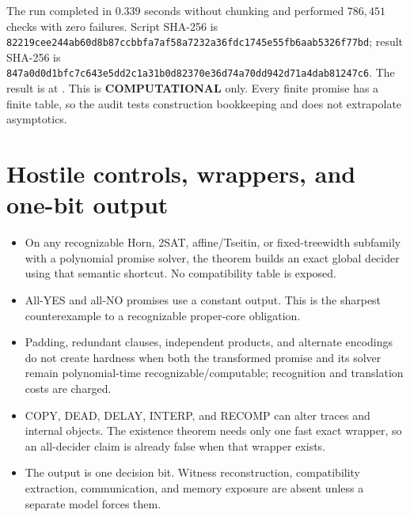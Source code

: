 \documentclass[11pt]{article}
\newcommand{\COMP}{\textbf{COMPUTATIONAL}}
\begin{document}
The run completed in $0.339$ seconds without chunking and performed
$786{,}451$ checks with zero failures.  Script SHA-256 is
\texttt{82219cee244ab60d8b87ccbbfa7af58a7232a36fdc1745e55fb6aab5326f77bd};
result SHA-256 is
\texttt{847a0d0d1bfc7c643e5dd2c1a31b0d82370e36d74a70dd942d71a4dab81247c6}.
The result is at
.
This is \COMP{} only.  Every finite promise has a finite table, so the audit
tests construction bookkeeping and does not extrapolate asymptotics.

\section{Hostile controls, wrappers, and one-bit output}
\begin{itemize}[leftmargin=*]
\item On any recognizable Horn, 2SAT, affine/Tseitin, or fixed-treewidth
subfamily with a polynomial promise solver, the theorem builds an exact global
decider using that semantic shortcut.  No compatibility table is exposed.
\item All-YES and all-NO promises use a constant output.  This is the sharpest
counterexample to a recognizable proper-core obligation.
\item Padding, redundant clauses, independent products, and alternate
encodings do not create hardness when both the transformed promise and its
solver remain polynomial-time recognizable/computable; recognition and
translation costs are charged.
\item COPY, DEAD, DELAY, INTERP, and RECOMP can alter traces and internal
objects.  The existence theorem needs only one fast exact wrapper, so an
all-decider claim is already false when that wrapper exists.
\item The output is one decision bit.  Witness reconstruction, compatibility
extraction, communication, and memory exposure are absent unless a separate
model forces them.
\end{itemize}
\end{document}
